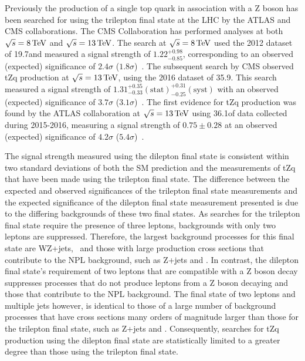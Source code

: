 Previously the production of a single top quark in association with a Z boson has been searched for using the trilepton final state at the LHC by the ATLAS and CMS collaborations.
The CMS Collaboration has performed analyses at both $\sqrt{s} = 8 \,\text{Te\hspace{-.08em}V}$ and $\sqrt{s} = 13 \,\text{Te\hspace{-.08em}V}$.
The search at $\sqrt{s} = 8 \,\text{Te\hspace{-.08em}V}$ used the 2012 dataset of 19.7\fbinv and measured a signal strength of $1.22^{+0.98}_{-0.85}$, corresponding to an observed (expected) significance of $2.4 \sigma$ ($1.8\sigma$)~\cite{Sirunyan:2017kkr}.
The subsequent search by CMS observed tZq production at $\sqrt{s} = 13 \,\text{Te\hspace{-.08em}V}$, using the 2016 dataset of 35.9\fbinv. 
This search measured a signal strength of $1.31^{+0.35}_{-0.33} (\textrm{stat}) ^{+0.31}_{-0.25}(\textrm{syst})$ with an observed (expected) significance of $3.7 \sigma$ ($3.1\sigma$)~\cite{Sirunyan:2017nbr}.
The first evidence for tZq production was found by the ATLAS collaboration at $\sqrt{s} = 13 \,\text{Te\hspace{-.08em}V}$ using 36.1\fbinv of data collected during 2015-2016, measuring a signal strength of $0.75 \pm 0.28$ at an observed (expected) significance of $4.2\sigma$ ($5.4\sigma$)~\cite{Aaboud:2017ylb}.

The signal strength measured using the dilepton final state is consistent within two standard deviations of both the SM prediction and the measurements of tZq that have been made using the trilepton final state.
The difference between the expected and observed significances of the trilepton final state  measurements and the expected significance of the dilepton final state measurement presented is due to the differing backgrounds of these two final states.
As searches for the trilepton final state require the presence of three leptons, backgrounds with only two leptons are suppressed.
Therefore, the largest background processes for this final state are WZ+jets, \ttZ~and those with large production cross sections that contribute to the NPL background, such as Z+jets and \ttbar.
In contrast, the dilepton final state's requirement of two leptons that are compatible with a Z boson decay suppresses processes that do not produce leptons from a Z boson decaying and those that contribute to the NPL background.
The final state of two leptons and multiple jets however, is identical to those of a large number of background processes that have cross sections many orders of magnitude larger than those for the trilepton final state, such as Z+jets and \ttbar.
Consequently, searches for tZq production using the dilepton final state are statistically limited to a greater degree than those using the trilepton final state.